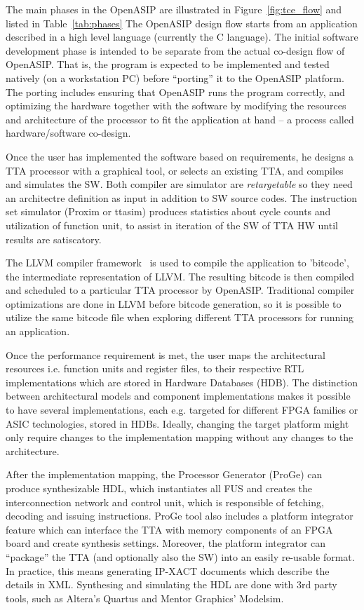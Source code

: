 \documentclass[a4paper,twoside]{tceusermanual}
\begin{document}
The main phases in the OpenASIP are illustrated in
Figure~\ref{fig:tce_flow} and listed in Table~\ref{tab:phases} The
OpenASIP design flow starts from an application described in a high level
language (currently the C language).  The initial software development
phase is intended to be separate from the actual co-design flow of
OpenASIP. That is, the program is expected to be implemented and tested
natively (on a workstation PC) before ``porting'' it to the OpenASIP
platform. The porting includes ensuring that OpenASIP runs the program
correctly, and optimizing the hardware together with the software by
modifying the resources and architecture of the processor to fit the
application at hand -- a process called hardware/software co-design.

Once the user has implemented the software based on requirements, he
designs a TTA processor with a graphical tool, or selects an existing
TTA, and compiles and simulates the SW. Both compiler are simulator are
\textit{retargetable} so they need an architectre definition as 
input in addition to SW source codes. The instruction set simulator (Proxim
or ttasim) produces statistics about cycle counts and utilization of function 
unit, to assist in iteration of the SW of TTA HW until results are satiscatory.

The LLVM compiler framework~\cite{llvm-home-page} is used to compile
the application to 'bitcode', the intermediate representation of
LLVM. The resulting bitcode is then compiled and scheduled to a
particular TTA processor by OpenASIP. Traditional compiler optimizations
are done in LLVM before bitcode generation, so it is possible to
utilize the same bitcode file when exploring different TTA processors
for running an application.

Once the performance requirement is met, the user maps the
architectural resources i.e. function units and register files, to
their respective RTL implementations which are stored in Hardware
Databases (HDB). The distinction between architectural models and
component implementations makes it possible to have several
implementations, each e.g. targeted for different FPGA families or
ASIC technologies, stored in HDBs. Ideally, changing the target
platform might only require changes to the implementation mapping
without any changes to the architecture.

After the implementation mapping, the Processor Generator (ProGe) can
produce synthesizable HDL, which instantiates all FUS and creates the
interconnection network and control unit, which is responsible of
fetching, decoding and issuing instructions. ProGe tool also includes
a platform integrator feature which can interface the TTA with memory
components of an FPGA board and create synthesis settings. Moreover,
the platform integrator can ``package'' the TTA (and optionally also the
SW) into an easily re-usable format. In practice, this means generating
IP-XACT documents which describe the details in XML. Synthesing and
simulating the HDL are done with 3rd party tools, such as Altera's
Quartus and Mentor Graphics' Modelsim.
\end{document}
